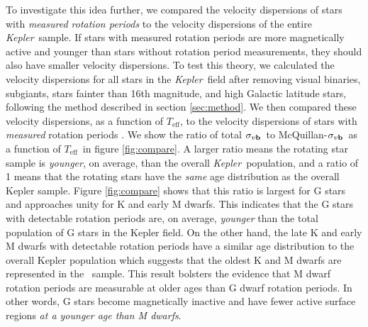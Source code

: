 \documentclass{aastex63}
\newcommand{\ie}{{\it i.e.}}
\newcommand{\kepler}{{\it Kepler}}
\newcommand{\Kepler}{{\it Kepler}}
\newcommand{\teff}{$T_{\mathrm{eff}}$}
\newcommand{\sigmavb}{$\sigma_{v{\bf b}}$}
\newcommand{\mct}{\citet{mcquillan2014}}
\newcommand{\racomment}[1]{{\color{blue}#1}}
\begin{document}
\racomment{
    To investigate this idea further, we compared the velocity dispersions of
stars with {\it measured rotation periods} to the velocity dispersions of the
entire \kepler\ sample.
If stars with measured rotation periods are more magnetically active and
younger than stars without rotation period measurements, they should also have
smaller velocity dispersions.
To test this theory, we calculated the velocity dispersions for all stars in
the \kepler\ field after removing visual binaries, subgiants, stars fainter
than 16th magnitude, and high Galactic latitude stars, following the method
described in section \ref{sec:method}.
We then compared these velocity dispersions, as a function of
\teff, to the velocity dispersions of stars with {\it measured} rotation
periods \citep[\ie\ stars that appear in table 1 of][]{mcquillan2014}.
We show the ratio of total \sigmavb\ to McQuillan-\sigmavb\ as a
function of \teff\ in figure \ref{fig:compare}.}
A larger ratio means the rotating star sample is {\it younger}, on average,
than the overall \Kepler\ population, and a ratio of 1 means that the rotating
stars have the {\it same} age distribution as the overall Kepler sample.
Figure \ref{fig:compare} shows that this ratio is largest for G stars and
approaches unity for K and early M dwarfs.
This indicates that the G stars with detectable rotation periods are, on
average, {\it younger} than the total population of G stars in the Kepler
field.
On the other hand, the late K and early M dwarfs with detectable rotation
periods have a similar age distribution to the overall Kepler population which
suggests that the oldest K and M dwarfs are represented in the \mct\ sample.
This result bolsters the evidence that M dwarf rotation periods are measurable
at older ages than G dwarf rotation periods.
In other words, G stars become magnetically inactive and have fewer active
surface regions {\it at a younger age than M dwarfs}.
\end{document}
